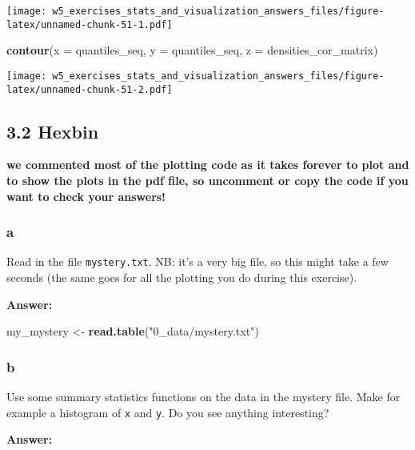\documentclass[]{article}
\newenvironment{Shaded}{\begin{snugshade}}{\end{snugshade}}
\newcommand{\DataTypeTok}[1]{\textcolor[rgb]{0.13,0.29,0.53}{#1}}
\newcommand{\KeywordTok}[1]{\textcolor[rgb]{0.13,0.29,0.53}{\textbf{#1}}}
\newcommand{\NormalTok}[1]{#1}
\newcommand{\StringTok}[1]{\textcolor[rgb]{0.31,0.60,0.02}{#1}}
\begin{document}
\texttt{[image: w5\_exercises\_stats\_and\_visualization\_answers\_files/figure-latex/unnamed-chunk-51-1.pdf]}

\begin{Shaded}
\begin{Highlighting}[]
\KeywordTok{contour}\NormalTok{(}\DataTypeTok{x =}\NormalTok{ quantiles_seq, }\DataTypeTok{y =}\NormalTok{ quantiles_seq, }\DataTypeTok{z =}\NormalTok{ densities_cor_matrix)}
\end{Highlighting}
\end{Shaded}

\texttt{[image: w5\_exercises\_stats\_and\_visualization\_answers\_files/figure-latex/unnamed-chunk-51-2.pdf]}

\hypertarget{hexbin}{%
\subsection{3.2 Hexbin}\label{hexbin}}

\textbf{we commented most of the plotting code as it takes forever to
plot and to show the plots in the pdf file, so uncomment or copy the
code if you want to check your answers!}

\hypertarget{a-9}{%
\subsubsection{a}\label{a-9}}

Read in the file \texttt{mystery.txt}. NB: it's a very big file, so this
might take a few seconds (the same goes for all the plotting you do
during this exercise).

\textbf{Answer:}

\begin{Shaded}
\begin{Highlighting}[]
\NormalTok{my_mystery <-}\StringTok{ }\KeywordTok{read.table}\NormalTok{(}\StringTok{"0_data/mystery.txt"}\NormalTok{)}
\end{Highlighting}
\end{Shaded}

\hypertarget{b-9}{%
\subsubsection{b}\label{b-9}}

Use some summary statistics functions on the data in the mystery file.
Make for example a histogram of \texttt{x} and \texttt{y}. Do you see
anything interesting?

\textbf{Answer:}
\end{document}
